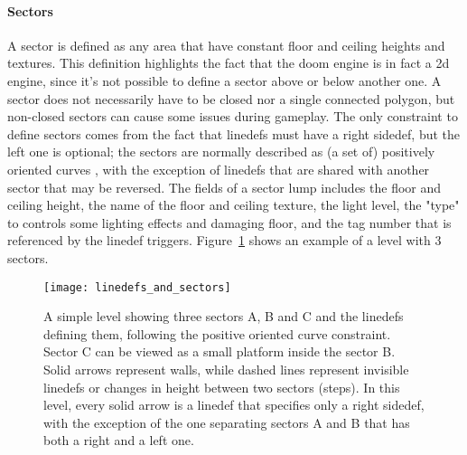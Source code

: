 \paragraph{Sectors} A sector is defined as any area that have constant floor and ceiling heights and textures. This definition highlights the fact that the doom engine is in fact a 2d engine, since it's not possible to define a sector above or below another one. A sector does not necessarily have to be closed nor a single connected polygon, but non-closed sectors can cause some issues during gameplay. The only constraint to define sectors comes from the fact that linedefs must have a right sidedef, but the left one is optional; the sectors are normally described as (a set of) positively oriented curves \cite{poly_orient}, with the exception of linedefs that are shared with another sector that may be reversed. The fields of a sector lump includes the floor and ceiling height, the name of the floor and ceiling texture, the light level, the "type" to controls some lighting effects and damaging floor, and the tag number that is referenced by the linedef triggers. Figure~\ref{fig:sectors} shows an example of a level with 3 sectors.


\begin{figure}
	\begin{center}
		\texttt{[image: linedefs\_and\_sectors]}
	\end{center}
	
	\captionsetup{width=0.8\linewidth}
	\caption[A simple level showing sectors and linedefs]{A simple level showing three sectors A, B and C and the linedefs defining them, following the positive oriented curve constraint. Sector C can be viewed as a small platform inside the sector B. Solid arrows represent walls, while dashed lines represent invisible linedefs or changes in height between two sectors (steps). In this level, every solid arrow is a linedef that specifies only a right sidedef, with the exception of the one separating sectors A and B that has both a right and a left one.}
	\label{fig:sectors}
	\medskip
	
\end{figure}


